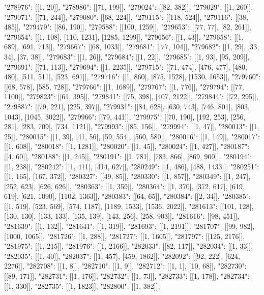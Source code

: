 { "278976": [[1, 20]],
 "278986": [[71, 199]],
 "279024": [[82, 382]],
 "279029": [[1, 260]],
 "279071": [[71, 244]],
 "279080": [[68, 224]],
 "279115": [[118, 524]],
 "279116": [[38, 485]],
 "279479": [[86, 190]],
 "279588": [[100, 1259]],
 "279653": [[77, 77], [82, 261]],
 "279654": [[1, 108], [110, 1231], [1285, 1299]],
 "279656": [[1, 43]],
 "279658": [[1, 689], [691, 713]],
 "279667": [[68, 1033]],
 "279681": [[77, 104]],
 "279682": [[1, 29], [33, 34], [37, 38]],
 "279683": [[1, 26]],
 "279684": [[1, 22]],
 "279685": [[1, 93], [95, 209]],
 "279691": [[71, 113]],
 "279694": [[1, 2235]],
 "279715": [[71, 474], [476, 477], [480, 480], [511, 511], [523, 691]],
 "279716": [[1, 860], [875, 1528], [1530, 1653]],
 "279760": [[68, 578], [585, 728]],
 "279766": [[1, 1689]],
 "279767": [[1, 776]],
 "279794": [[77, 1100]],
 "279823": [[61, 395]],
 "279841": [[75, 398], [407, 2122]],
 "279844": [[72, 295]],
 "279887": [[79, 221], [225, 397]],
 "279931": [[84, 628], [630, 743], [746, 801], [803, 1043], [1045, 3022]],
 "279966": [[79, 441]],
 "279975": [[70, 190], [192, 253], [256, 281], [283, 709], [734, 1121]],
 "279993": [[85, 156]],
 "279994": [[1, 47]],
 "280013": [[1, 25]],
 "280015": [[1, 39], [41, 56], [59, 554], [560, 580]],
 "280016": [[1, 149]],
 "280017": [[1, 608]],
 "280018": [[1, 1281]],
 "280020": [[1, 45]],
 "280024": [[1, 427]],
 "280187": [[4, 60]],
 "280188": [[1, 245]],
 "280191": [[1, 781], [783, 866], [869, 900]],
 "280194": [[1, 238]],
 "280242": [[1, 411], [414, 627]],
 "280249": [[1, 486], [488, 1433]],
 "280251": [[1, 165], [167, 372]],
 "280327": [[49, 85]],
 "280330": [[1, 857]],
 "280349": [[1, 247], [252, 623], [626, 626]],
 "280363": [[1, 359]],
 "280364": [[1, 370], [372, 617], [619, 619], [621, 1090], [1102, 1363]],
 "280383": [[64, 65]],
 "280384": [[2, 34]],
 "280385": [[1, 519], [523, 569], [574, 1187], [1189, 1533], [1536, 2022]],
 "281613": [[101, 128], [130, 130], [133, 133], [135, 139], [143, 256], [258, 903]],
 "281616": [[98, 451]],
 "281639": [[1, 132]],
 "281641": [[1, 319]],
 "281693": [[1, 2191]],
 "281707": [[99, 982], [1000, 1065]],
 "281726": [[1, 288]],
 "281727": [[1, 1605]],
 "281797": [[125, 2176]],
 "281975": [[1, 215]],
 "281976": [[1, 2166]],
 "282033": [[82, 117]],
 "282034": [[1, 33]],
 "282035": [[1, 40]],
 "282037": [[1, 457], [459, 1862]],
 "282092": [[92, 222], [624, 2276]],
 "282708": [[1, 8]],
 "282710": [[1, 9]],
 "282712": [[1, 1], [10, 68]],
 "282730": [[89, 171]],
 "282731": [[1, 176]],
 "282732": [[1, 73]],
 "282733": [[1, 178]],
 "282734": [[1, 330]],
 "282735": [[1, 1823]],
 "282800": [[1, 382]],
}
